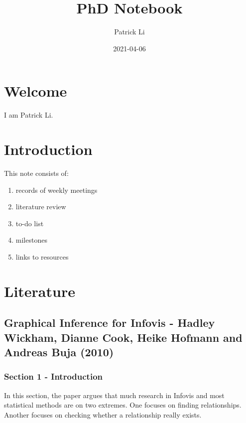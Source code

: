 \documentclass[
]{book}
\title{PhD Notebook}
\author{Patrick Li}
\date{2021-04-06}
\providecommand{\tightlist}{%
  \setlength{\itemsep}{0pt}\setlength{\parskip}{0pt}}
\begin{document}
\maketitle

{
\setcounter{tocdepth}{1}
\tableofcontents
}
\hypertarget{welcome}{%
\chapter{Welcome}\label{welcome}}

I am Patrick Li.

\hypertarget{introduction}{%
\chapter{Introduction}\label{introduction}}

This note consists of:

\begin{enumerate}
\def\labelenumi{\arabic{enumi}.}
\tightlist
\item
  records of weekly meetings
\item
  literature review
\item
  to-do list
\item
  milestones
\item
  links to resources
\end{enumerate}

\hypertarget{literature}{%
\chapter{Literature}\label{literature}}

\hypertarget{graphical-inference-for-infovis---hadley-wickham-dianne-cook-heike-hofmann-and-andreas-buja-2010}{%
\section{Graphical Inference for Infovis - Hadley Wickham, Dianne Cook, Heike Hofmann and Andreas Buja (2010)}\label{graphical-inference-for-infovis---hadley-wickham-dianne-cook-heike-hofmann-and-andreas-buja-2010}}

\hypertarget{section-1---introduction}{%
\subsection{Section 1 - Introduction}\label{section-1---introduction}}

In this section, the paper argues that much research in Infovis and most statistical methods are on two extremes. One focuses on finding relationships. Another focuses on checking whether a relationship really exists.
\end{document}
